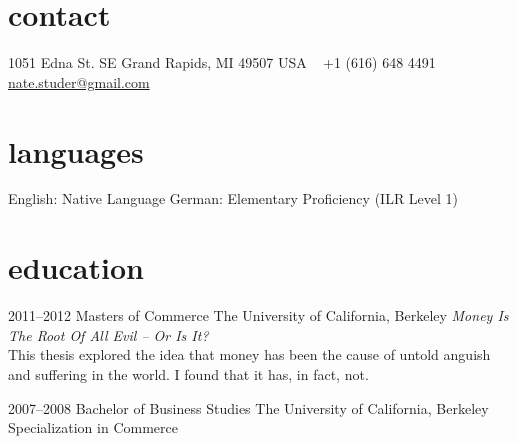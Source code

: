\documentclass[print]{template/friggeri-cv} %
\begin{document}


\begin{aside} %
\section{contact}
1051 Edna St. SE
Grand Rapids, MI 49507
USA
~
+1 (616) 648 4491
~
\href{mailto:nate.studer@gmail.com}{nate.studer@gmail.com}
\section{languages}
English:  Native Language
German:  Elementary Proficiency (ILR Level 1)
\end{aside}


\section{education}

\begin{entrylist}


\entry
{2011--2012}
{Masters {\normalfont of Commerce}}
{The University of California, Berkeley}
{\emph{Money Is The Root Of All Evil -- Or Is It?} \\ This thesis explored the idea that money has been the cause of untold anguish and suffering in the world. I found that it has, in fact, not.}


\entry
{2007--2008}
{Bachelor {\normalfont of Business Studies}}
{The University of California, Berkeley}
{Specialization in Commerce}


\end{entrylist}
\end{document}
